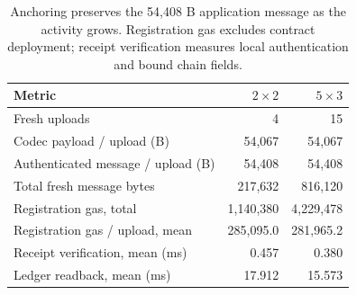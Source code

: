 \begin{table}[!htb]\centering\small
\caption{Anchoring preserves the 54,408 B application message as the activity grows. Registration gas excludes contract deployment; receipt verification measures local authentication and bound chain fields.}\label{tab:chaincost}
\setlength{\tabcolsep}{5pt}
\begin{tabular}{lrr}\toprule
Metric & $2\times2$ & $5\times3$\\\midrule
Fresh uploads & 4 & 15\\
Codec payload / upload (B) & 54,067 & 54,067\\
Authenticated message / upload (B) & 54,408 & 54,408\\
Total fresh message bytes & 217,632 & 816,120\\
Registration gas, total & 1,140,380 & 4,229,478\\
Registration gas / upload, mean & 285,095.0 & 281,965.2\\
Receipt verification, mean (ms) & 0.457 & 0.380\\
Ledger readback, mean (ms) & 17.912 & 15.573\\\bottomrule
\end{tabular}
\end{table}
